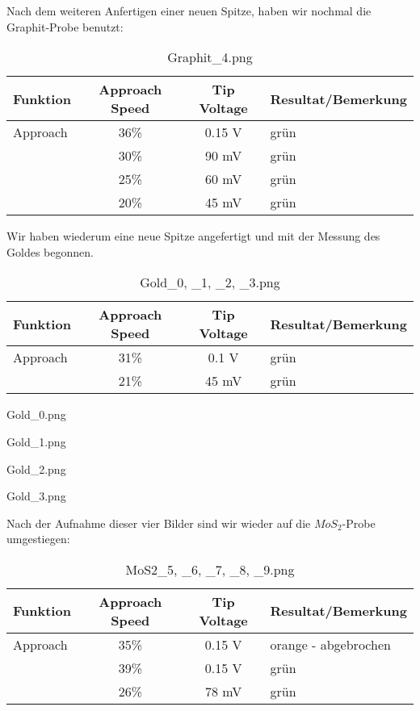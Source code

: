 
Nach dem weiteren Anfertigen einer neuen Spitze, haben wir nochmal die Graphit-Probe benutzt:

\begin{table}[H]
\caption{Graphit\_4.png}
\centering \begin{tabular}[H]{l c c l}
Funktion & Approach Speed & Tip Voltage & Resultat/Bemerkung\\ \hline
Approach & 36\% & 0.15 V & grün\\
 & 30\% & 90 mV & grün\\
 & 25\% & 60 mV & grün\\
 & 20\% & 45 mV & grün
\end{tabular}
\end{table}


Wir haben wiederum eine neue Spitze angefertigt und mit der Messung des Goldes begonnen. 

\begin{table}[H]
\caption{Gold\_0, \_1, \_2, \_3.png}
\centering \begin{tabular}[H]{l c c l}
Funktion & Approach Speed & Tip Voltage & Resultat/Bemerkung\\ \hline
Approach & 31\% & 0.1 V & grün\\
 & 21\% & 45 mV & grün\\
\end{tabular}
\end{table}

Gold\_0.png 

\begin{samepage} Gold\_1.png  \end{samepage}

Gold\_2.png 

Gold\_3.png 

Nach der Aufnahme dieser vier Bilder sind wir wieder auf die $MoS_2$-Probe umgestiegen:

\begin{table}[H]
\caption{MoS2\_5, \_6, \_7, \_8, \_9.png}
\centering \begin{tabular}[H]{l c c l}
Funktion & Approach Speed & Tip Voltage & Resultat/Bemerkung\\ \hline
Approach & 35\% & 0.15 V & orange - abgebrochen\\
 & 39\% & 0.15 V & grün\\
 & 26\% & 78 mV & grün
\end{tabular}
\end{table}

